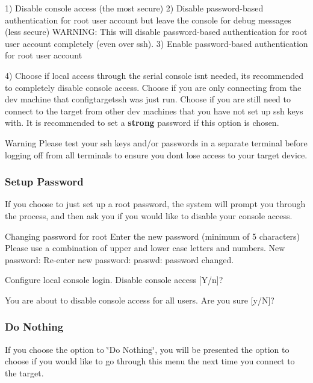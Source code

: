 \begin{DoxyVerb}1) Disable console access (the most secure)
2) Disable password-based authentication for root user account
       but leave the console for debug messages (less secure)
       WARNING: This will disable password-based authentication for
       root user account completely (even over ssh).
3) Enable password-based authentication for root user account
\end{DoxyVerb}


4) Choose {} if local access through the serial console isn\textquotesingle{}t needed, it\textquotesingle{}s recommended to completely disable console access. Choose {} if you are only connecting from the dev machine that {\ttfamily configtargetssh} was just run. Choose {} if you are still need to connect to the target from other dev machines that you have not set up ssh keys with. It is recommended to set a {\bfseries strong} password if this option is chosen.

\begin{DoxyWarning}{Warning}
Please test your ssh keys and/or passwords in a separate terminal before logging off from all terminals to ensure you don\textquotesingle{}t lose access to your target device.
\end{DoxyWarning}
\hypertarget{basicTarget_targetSetupPass}{}\subsubsection{Setup Password}\label{basicTarget_targetSetupPass}
If you choose to just set up a root password, the system will prompt you through the process, and then ask you if you would like to disable your console access.

\begin{DoxyVerb}Changing password for root
Enter the new password (minimum of 5 characters)
Please use a combination of upper and lower case letters and numbers.
New password:
Re-enter new password:
passwd: password changed.

Configure local console login.
  Disable console access [Y/n]?


You are about to disable console access for all users.
Are you sure [y/N]?
\end{DoxyVerb}
\hypertarget{basicTarget_targetDoNothing}{}\subsubsection{Do Nothing}\label{basicTarget_targetDoNothing}
If you choose the option to \char`\"{}\+Do Nothing\char`\"{}, you will be presented the option to choose if you would like to go through this menu the next time you connect to the target.

